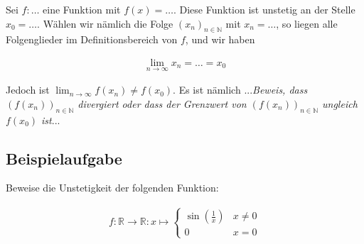 \documentclass[fontsize=9pt,
               parskip=half-,
               DIV=14,
               listof=chapterentry,
               tocflat]{scrbook}
\begin{document}
\begin{importantparagraph*}
Sei $f:\ldots $ eine Funktion mit $f(x)=\ldots $. Diese Funktion ist unstetig an der Stelle $x_{0}=\ldots $. Wählen wir nämlich die Folge $(x_{n})_{n\in \mathbb {N} }$ mit $x_{n}=\ldots $, so liegen alle Folgenglieder im Definitionsbereich von $f$, und wir haben

\begin{align*}
\lim _{n\to \infty }x_{n}=\ldots =x_{0}
\end{align*}

Jedoch ist $\lim _{n\to \infty }f(x_{n})\neq f(x_{0})$. Es ist nämlich ...\emph{Beweis, dass $\left(f(x_{n})\right)_{n\in \mathbb {N} }$ divergiert oder dass der Grenzwert von $\left(f(x_{n})\right)_{n\in \mathbb {N} }$ ungleich $f(x_{0})$ ist}...

\end{importantparagraph*}

\subsection{Beispielaufgabe}

\begin{exercise*}
Beweise die Unstetigkeit der folgenden Funktion:

\begin{align*}
f:\mathbb {R} \to \mathbb {R} :x\mapsto {\begin{cases}\sin \left({\frac {1}{x}}\right)&x\neq 0\\0&x=0\end{cases}}
\end{align*}

\end{exercise*}
\end{document}
